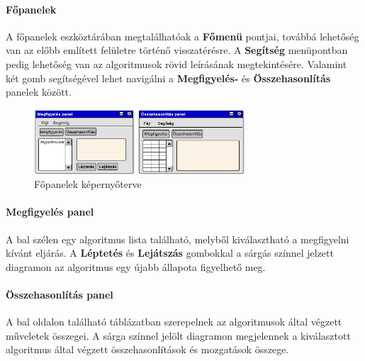 \documentclass{elteikthesis}
\begin{document}
\paragraph{Főpanelek}
A főpanelek eszköztárában megtalálhatóak a \textbf{Főmenü} pontjai, továbbá lehetőség van az előbb említett felületre történő visszatérésre. A \textbf{Segítség} menüpontban pedig lehetőség van az algoritmusok rövid leírásának megtekintésére. Valamint két gomb segítségével lehet navigálni a \textbf{Megfigyelés-} és \textbf{Összehasonlítás} panelek között.
\begin{figure}[H]
	\centering
	\includegraphics[width=0.7\textwidth]{pics/plan_panels.png}
	\caption{Főpanelek képernyőterve}
\end{figure}
\paragraph{Megfigyelés panel}
A bal szélen egy algoritmus lista található, melyből kiválasztható a megfigyelni kívánt eljárás. A \textbf{Léptetés} és \textbf{Lejátszás} gombokkal a sárgás színnel jelzett diagramon az algoritmus egy újabb állapota figyelhető meg.
\paragraph{Összehasonlítás panel}
A bal oldalon található táblázatban szerepelnek az algoritmusok által végzett műveletek összegei. A sárga színnel jelölt diagramon megjelennek a kiválasztott algoritmus által végzett összehasonlítások és mozgatások összege.
\end{document}
